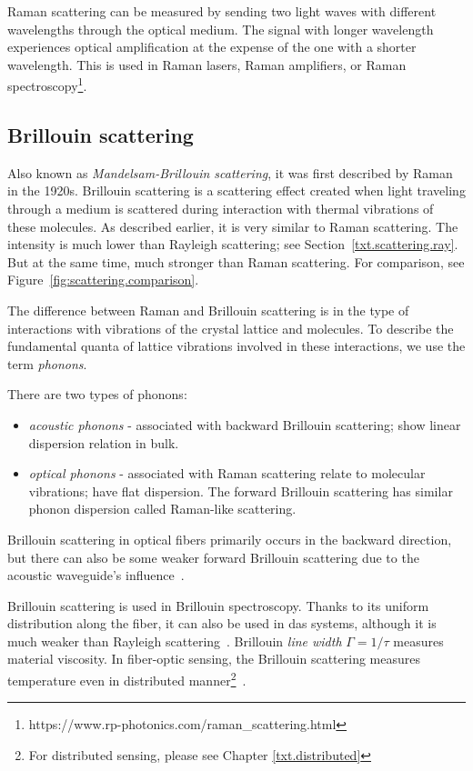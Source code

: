 
Raman scattering can be measured by sending two light waves with different wavelengths through the optical medium. The  signal with longer wavelength experiences optical amplification at the expense of the one with a shorter wavelength. This is used in Raman lasers, Raman amplifiers, or Raman spectroscopy\footnote{https://www.rp-photonics.com/raman\_scattering.html}.


\subsection{Brillouin scattering}\label{txt.scattering.bril}

Also known as \textit{Mandelsam-Brillouin scattering}, it was first described by Raman in the 1920s. Brillouin scattering is a scattering effect created when light traveling through a medium is scattered during interaction with thermal vibrations of these molecules. As described earlier, it is very similar to Raman scattering. The intensity is much lower than Rayleigh scattering; see Section~\ref{txt.scattering.ray}. But at the same time, much stronger than Raman scattering. For comparison, see Figure~\ref{fig:scattering.comparison}.

The difference between Raman and Brillouin scattering is in the type of interactions with vibrations of the crystal lattice and molecules. To describe the fundamental quanta of lattice vibrations involved in these interactions, we use the term \textit{phonons}. 

There are two types of phonons:

\begin{itemize}
    \item \textit{acoustic phonons} - associated with backward Brillouin scattering; show linear dispersion relation in bulk. 
    \item \textit{optical phonons} - associated with Raman scattering relate to molecular vibrations; have flat dispersion. The forward Brillouin scattering has similar phonon dispersion called Raman-like scattering. 
\end{itemize}

Brillouin scattering in optical fibers primarily occurs in the backward direction, but there can also be some weaker forward Brillouin scattering due to the acoustic waveguide's influence~\cite{bhundred}.

Brillouin scattering is used in Brillouin spectroscopy. Thanks to its uniform distribution along the fiber, it can also be used in \ac{das} systems, although it is much weaker than Rayleigh scattering~\cite{dasKislov}. Brillouin \textit{line width} $\Gamma=1/\tau$ measures material viscosity. In fiber-optic sensing, the Brillouin scattering measures temperature even in distributed manner\footnote{For distributed sensing, please see Chapter \ref{txt.distributed}}~\cite{bhundred}.


